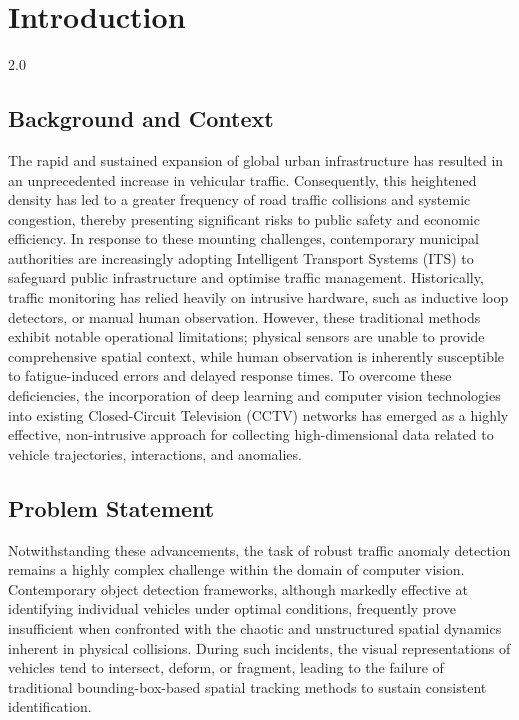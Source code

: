 
\chapter{Introduction}
\label{ch:introduction}

\begin{spacing}{2.0}

\section{Background and Context}
The rapid and sustained expansion of global urban infrastructure has resulted in an unprecedented increase in vehicular traffic. Consequently, this heightened density has led to a greater frequency of road traffic collisions and systemic congestion, thereby presenting significant risks to public safety and economic efficiency. In response to these mounting challenges, contemporary municipal authorities are increasingly adopting Intelligent Transport Systems (ITS) to safeguard public infrastructure and optimise traffic management. Historically, traffic monitoring has relied heavily on intrusive hardware, such as inductive loop detectors, or manual human observation. However, these traditional methods exhibit notable operational limitations; physical sensors are unable to provide comprehensive spatial context, while human observation is inherently susceptible to fatigue-induced errors and delayed response times. To overcome these deficiencies, the incorporation of deep learning and computer vision technologies into existing Closed-Circuit Television (CCTV) networks has emerged as a highly effective, non-intrusive approach for collecting high-dimensional data related to vehicle trajectories, interactions, and anomalies.

\section{Problem Statement}
Notwithstanding these advancements, the task of robust traffic anomaly detection remains a highly complex challenge within the domain of computer vision. Contemporary object detection frameworks, although markedly effective at identifying individual vehicles under optimal conditions, frequently prove insufficient when confronted with the chaotic and unstructured spatial dynamics inherent in physical collisions. During such incidents, the visual representations of vehicles tend to intersect, deform, or fragment, leading to the failure of traditional bounding-box-based spatial tracking methods to sustain consistent identification.


\end{spacing}
